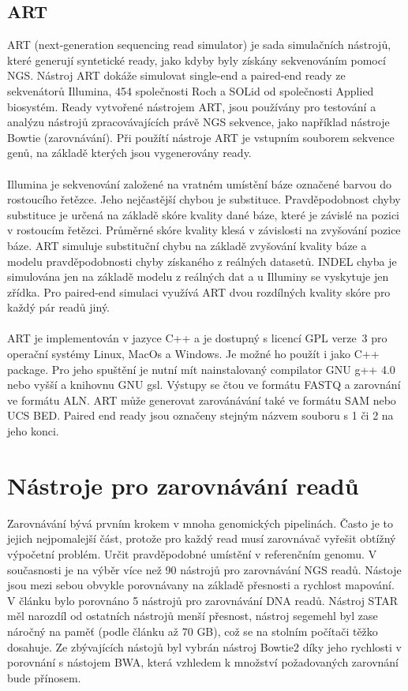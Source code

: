 \documentclass[czech,DP]{thesiskiv}
\numberwithin{equation}{section}
\begin{document}
\subsection{ART}
ART (next-generation sequencing read simulator) je sada simulačních nástrojů, které generují syntetické ready, jako kdyby byly získány sekvenováním pomocí NGS. Nástroj ART dokáže simulovat single-end a paired-end ready ze sekvenátorů Illumina, 454 společnosti Roch a SOLid od společnosti Applied biosystém. Ready vytvořené nástrojem ART, jsou používány pro testování a analýzu nástrojů zpracovávajících právě NGS sekvence, jako například nástroje Bowtie (zarovnávání). Při použítí nástroje ART je vstupním souborem sekvence genů, na základě kterých jsou vygenerovány ready. \cite{art}
\\
\\
Illumina je sekvenování založené na vratném umístění báze označené barvou do rostoucího řetězce. Jeho nejčastější chybou je substituce. Pravděpodobnost chyby substituce je určená na základě skóre kvality dané báze, které je závislé na pozici v rostoucím řetězci. Průměrné skóre kvality klesá v závislosti na zvyšování pozice báze. ART simuluje substituční chybu na základě zvyšování kvality báze a modelu pravděpodobnosti chyby získaného z reálných datasetů. INDEL chyba je simulována jen na základě modelu z reálných dat a u Illuminy se vyskytuje jen zřídka. Pro paired-end simulaci využívá ART dvou rozdílných kvality skóre pro každý pár readů jiný. 
\\
\\
ART je implementován v jazyce C++ a je dostupný s licencí GPL verze~3 pro operační systémy Linux, MacOs a Windows. Je možné ho použít i jako C++ package. Pro jeho spuštění je nutní mít nainstalovaný compilator GNU g++ 4.0 nebo vyšší a knihovnu GNU gsl. Výstupy se čtou ve formátu FASTQ a zarovnání ve formátu ALN. ART může generovat zarovánávání také ve formátu SAM nebo UCS BED. Paired end ready jsou označeny stejným názvem souboru s 1 či 2 na jeho konci.

\section{Nástroje pro zarovnávání readů}
Zarovnávání bývá prvním krokem v mnoha genomických pipelinách. Často je to jejich nejpomalejší část, protože pro každý read musí zarovnávač vyřešit obtížný výpočetní problém. Určit pravděpodobné umístění v referenčním genomu. 
V současnosti je na výběr více než 90 nástrojů pro zarovnávání NGS readů.
Nástoje jsou mezi sebou obvykle porovnávany na základě přesnosti a rychlost mapování. V článku \cite{ngs_alignment_software} bylo porovnáno 5 nástrojů pro zarovnávání DNA readů.  Nástroj STAR měl narozdíl od ostatních nástrojů menší přesnost, nástroj segemehl byl zase náročný na paměť (podle článku až 70 GB), což se na stolním počítači těžko dosahuje. Ze zbývajících nástojů byl vybrán nástroj Bowtie2 díky jeho rychlosti v porovnání s nástojem BWA, která vzhledem k množství požadovaných zarovnání bude přínosem.  
\end{document}
